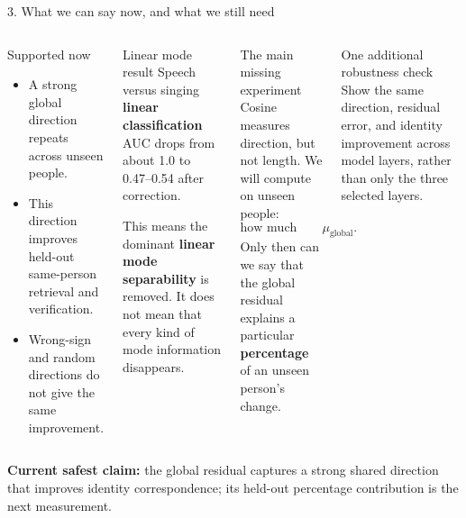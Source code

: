\documentclass[aspectratio=169,10pt]{ctexbeamer}
\begin{document}
\begin{frame}{3. What we can say now, and what we still need}
\begin{columns}[T,onlytextwidth]
\begin{block}{Supported now}
\small
\begin{itemize}
  \item A strong global direction repeats across unseen people.
  \item This direction improves held-out same-person retrieval and verification.
  \item Wrong-sign and random directions do not give the same improvement.
\end{itemize}
\end{block}

\begin{block}{Linear mode result}
\small
Speech versus singing \textbf{linear classification} AUC drops from about 1.0 to 0.47--0.54 after correction.

This means the dominant \textbf{linear mode separability} is removed. It does not mean that every kind of mode information disappears.
\end{block}

\begin{block}{The main missing experiment}
\small
Cosine measures direction, but not length. We will compute on unseen people:
\[
\text{how much residual error remains after using }\mu_{\mathrm{global}}.
\]
Only then can we say that the global residual explains a particular \textbf{percentage} of an unseen person's change.
\end{block}

\begin{block}{One additional robustness check}
\small
Show the same direction, residual error, and identity improvement across model layers, rather than only the three selected layers.
\end{block}
\end{columns}

\vspace{0.15cm}
\centering
\color{Navy}
\textbf{Current safest claim:} the global residual captures a strong shared direction that improves identity correspondence; its held-out percentage contribution is the next measurement.
\end{frame}
\end{document}
